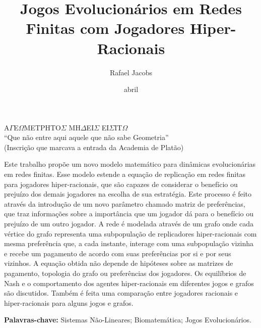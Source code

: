 \documentclass[masters]{./config/PPGMAp}
\title{Jogos Evolucionários em Redes Finitas com Jogadores Hiper-Racionais}
\date{abril}{2021}
\author[o]{Rafael Jacobs}{Kehl}
\theoremstyle{definition}
\begin{document}

%
%
\frontmatter %

	\coversheet

	\catalogsheet

	\approvalsheet

	\begin{epigraph}[0.7]
		{
			\normalfont\large
			A$\Gamma$E$\Omega$METPHTO$\Sigma$
			MH$\Delta$EI$\Sigma$
			EI$\Sigma$IT$\Omega$
		} \\[-12pt]
		``Que não entre aqui aquele que não sabe Geometria'' \\
		(Inscrição que marcava a entrada da Academia de Platão)
	\end{epigraph}

	\begin{acknowledgments}
		\lipsum[1]
	\end{acknowledgments}

	\tableofcontents

	\listoffigures

	\listoftables

	\printnomenclature

	\begin{resumo}
		Este trabalho propõe um novo modelo matemático para dinâmicas evolucionárias em redes finitas. Esse modelo estende a equação de replicação em redes finitas para jogadores hiper-racionais, que são capazes de considerar o benefício ou prejuízo dos demais jogadores na escolha de sua estratégia. Este processo é feito através da introdução de um novo parâmetro chamado matriz de preferências, que traz informações sobre a importância que um jogador dá para o benefício ou prejuízo de um outro jogador. A rede é modelada através de um grafo onde cada vértice do grafo representa uma subpopulação de replicadores hiper-racionais com mesma preferência que, a cada instante, interage com uma subpopulação vizinha e recebe um pagamento de acordo com suas preferências por si e por seus vizinhos. A equação obtida não depende de hipóteses sobre as matrizes de pagamento, topologia do grafo ou preferências dos jogadores. Os equilíbrios de Nash e o comportamento dos agentes hiper-racionais em diferentes jogos e grafos são discutidos. Também é feita uma comparação entre jogadores racionais e hiper-racionais para alguns jogos e grafos.
		
		\noindent \textbf{Palavras-chave:} Sistemas Não-Lineares; Biomatemática; Jogos Evolucionários.
	\end{resumo}
\end{document}

